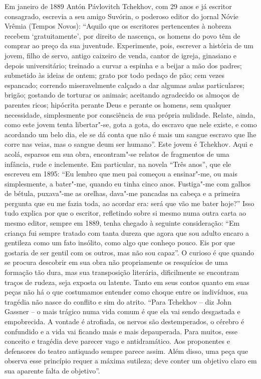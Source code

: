 Em janeiro de 1889 Antón Pávlovitch Tchekhov, com 29 anos e já escritor
consagrado, escrevia a seu amigo Suvórin, o poderoso editor do jornal
Nóvie Vrêmia (Tempos Novos): ``Aquilo que os escritores pertencentes à
nobreza recebem `gratuitamente', por direito de nascença, os homens do
povo têm de comprar ao preço da sua juventude. Experimente, pois,
escrever a história de um jovem, filho de servo, antigo caixeiro de
venda, cantor de igreja, ginasiano e depois universitário; treinado a
curvar a espinha e a beijar a mão dos padres; submetido às ideias de
ontem; grato por todo pedaço de pão; cem vezes espancado; correndo
miseravelmente calçado a dar algumas aulas particulares; brigão;
gostando de torturar os animais; aceitando agradecido os almoços de
parentes ricos; hipócrita perante Deus e perante os homens, sem qualquer
necessidade, simplesmente por consciência de sua própria nulidade.
Relate, ainda, como este jovem tenta libertar"-se, gota a gota, do
escravo que nele existe, e como acordando um belo dia, ele se dá conta
que não é mais um sangue escravo que lhe corre nas veias, mas o sangue
deum ser humano''. Este jovem é Tchekhov. Aqui e acolá, esparsos em sua
obra, encontram"-se relatos de fragmentos de uma infância, rude e
inclemente. Em particular, na novela ``Três anos'', que ele escreveu em
1895: ``Eu lembro que meu pai começou a ensinar"-me, ou mais
simplesmente, a bater"-me, quando eu tinha cinco anos. Fustiga"-me com
galhos de bétula, puxava"-me as orelhas, dava"-me pancadas na cabeça e a
primeira pergunta que eu me fazia toda, ao acordar era: será que vão me
bater hoje?'' Isso tudo explica por que o escritor, refletindo sobre si
mesmo numa outra carta ao mesmo editor, sempre em 1889, tenha chegado à
seguinte consideração: ``Em criança fui sempre tratado com tanta dureza
que agora que sou adulto encaro a gentileza como um fato insólito, como
algo que conheço pouco. Eis por que gostaria de ser gentil com os
outros, mas não sou capaz''. O curioso é que quando se procura descobrir
em sua obra não propriamente os resquícios de uma formação tão dura, mas
sua transposição literária, dificilmente se encontram traços de rudeza,
seja exposta ou latente. Tanto em seus contos quanto em suas peças não
há o que costumamos entender como choque entre os indivíduos, sua
tragédia não nasce do conflito e sim do atrito. ``Para Tchekhov -- diz
John Gassner -- o mais trágico numa vida comum é que ela vai sendo
desgastada e empobrecida. A vontade é atrofiada, os nervos são
destemperados, o cérebro é confundido e a vida vai ficando mais e mais
depauperada. Para muitos, esse conceito e tragédia deve parecer vago e
antidramático. Aos proponentes e defensores do teatro antiquado sempre
parece assim. Além disso, uma peça que observa esse princípio requer a
máxima sutileza; deve conter um objetivo claro em sua aparente falta de
objetivo''.

